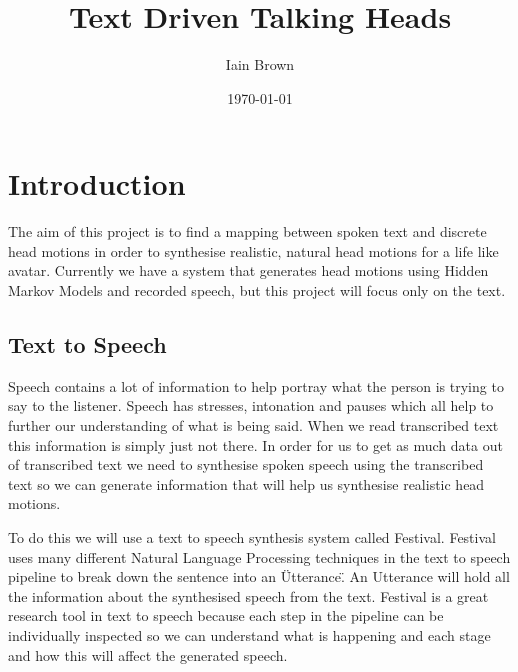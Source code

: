 \documentclass[bsc,frontabs,twoside,singlespacing,parskip]{infthesis}
\begin{document}
\title{Text Driven Talking Heads}

\author{Iain Brown}

\date{\today}
\maketitle
\tableofcontents
\chapter{Introduction}
The aim of this project is to find a mapping between spoken text and discrete head motions in order to synthesise realistic, natural head motions for a life like avatar. Currently we have a system that generates head motions using Hidden Markov Models and recorded speech, but this project will focus only on the text.
\section{Text to Speech}
Speech contains a lot of information to help portray what the person is trying to say to the listener. Speech has stresses, intonation and pauses which all help to further our understanding of what is being said. When we read transcribed text this information is simply just not there. In order for us to get as much data out of transcribed text we need to synthesise spoken speech using the transcribed text so we can generate information that will help us synthesise realistic head motions.

To do this we will use a text to speech synthesis system called Festival. Festival uses many different Natural Language Processing techniques in the text to speech pipeline to break down the sentence into an \"Utterance\". An Utterance will hold all the information about the synthesised speech from the text. Festival is a great research tool in text to speech because each step in the pipeline can be individually inspected so we can understand what is happening and each stage and how this will affect the generated speech.
\end{document}
